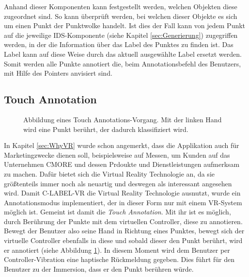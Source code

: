 Anhand dieser Komponenten kann festgestellt werden, welchen Objekten diese zugeordnet sind. So kann überprüft werden, bei welchen dieser Objekte es sich um einen Punkt der Punktwolke handelt. Ist dies der Fall kann von jedem Punkt auf die jeweilige IDS-Komponente (siehe Kapitel \ref{sec:Generierung}) zugegriffen werden, in der die Information über das Label des Punktes zu finden ist. Das Label kann auf diese Weise durch das aktuell ausgewählte Label ersetzt werden. Somit werden alle Punkte annotiert die, beim Annotationsbefehl des Benutzers, mit Hilfe des Pointers anvisiert sind.

\subsection{Touch Annotation}
\label{sec:TouchAnnotation}

\begin{figure}%
	\centering
    \caption{Abbildung eines Touch Annotations-Vorgang. Mit der linken Hand wird eine Punkt berührt, der dadurch klassifiziert wird.}
    \label{fig:TouchLabeling}
\end{figure}

In Kapitel \ref{sec:WhyVR} wurde schon angemerkt, dass die Applikation auch für Marketingzwecke dienen soll, beispielsweise auf Messen, um Kunden auf das Unternehmen CMORE und dessen Prdoukte und Dienstleistungen aufmerksam zu machen. Dafür bietet sich die Virtual Reality Technologie an, da sie größtenteils immer noch als neuartig und deswegen als interessant angesehen wird. Damit C-LABEL-VR die Virtual Reality Technologie ausnutzt, wurde ein Annotationsmodus implementiert, der in dieser Form nur mit einem VR-System möglich ist. Gemeint ist damit die \textit{Touch Annotation}. Mit ihr ist es möglich, durch Berührung der Punkte mit dem virtuellen Controller, diese zu annotieren. Bewegt der Benutzer also seine Hand in Richtung eines Punktes, bewegt sich der virtuelle Controller ebenfalls in diese und sobald dieser den Punkt berührt, wird er annotiert (siehe Abbildung \ref{fig:TouchLabeling}). In diesem Moment wird dem Benutzer per Controller-Vibration eine haptische Rückmeldung gegeben. Dies führt für den Benutzer zu der Immersion, dass er den Punkt berühren würde.\\

